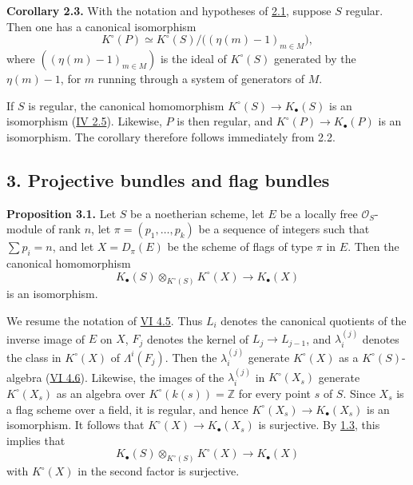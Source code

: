 \textbf{Corollary 2.3.} With the notation and hypotheses of \hyperlink{sga6.e09.para.2-1}{2.1}, suppose $S$ regular. Then one has a canonical isomorphism
\[
 K^\circ(P)\simeq K^\circ(S)/\bigl((\eta(m)-1)_{m\in M}\bigr),
\]
where $((\eta(m)-1)_{m\in M})$ is the ideal of $K^\circ(S)$ generated by the $\eta(m)-1$, for $m$ running through a system of generators of $M$.

If $S$ is regular, the canonical homomorphism $K^\circ(S)\to K_\bullet(S)$ is an isomorphism (\hyperlink{sga6.e04.para.2-5}{IV 2.5}). Likewise, $P$ is then regular, and $K^\circ(P)\to K_\bullet(P)$ is an isomorphism. The corollary therefore follows immediately from 2.2.

\subsection*{3. Projective bundles and flag bundles}

\textbf{Proposition 3.1.} Let $S$ be a noetherian scheme, let $E$ be a locally free $\mathcal O_S$-module of rank $n$, let $\pi=(p_1,\ldots,p_k)$ be a sequence of integers such that $\sum p_i=n$, and let $X=D_\pi(E)$ be the scheme of flags of type $\pi$ in $E$. Then the canonical homomorphism
\[
 K_\bullet(S)\otimes_{K^\circ(S)}K^\circ(X)\longrightarrow K_\bullet(X)
\]
is an isomorphism.

We resume the notation of \hyperlink{sga6.e06.sec.4.5}{VI 4.5}. Thus $L_i$ denotes the canonical quotients of the inverse image of $E$ on $X$, $F_j$ denotes the kernel of $L_j\to L_{j-1}$, and $\lambda_i^{(j)}$ denotes the class in $K^\circ(X)$ of $\Lambda^i(F_j)$. Then the $\lambda_i^{(j)}$ generate $K^\circ(X)$ as a $K^\circ(S)$-algebra (\hyperlink{sga6.e06.thm.4-6}{VI 4.6}). Likewise, the images of the $\lambda_i^{(j)}$ in $K^\circ(X_s)$ generate $K^\circ(X_s)$ as an algebra over $K^\circ(k(s))=\mathbb Z$ for every point $s$ of $S$. Since $X_s$ is a flag scheme over a field, it is regular, and hence $K^\circ(X_s)\to K_\bullet(X_s)$ is an isomorphism. It follows that $K^\circ(X)\to K_\bullet(X_s)$ is surjective. By \hyperlink{sga6.e09.cor.1-3}{1.3}, this implies that
\[
 K_\bullet(S)\otimes_{K^\circ(S)}K^\circ(X)\longrightarrow K_\bullet(X)
\]
with $K^\circ(X)$ in the second factor is surjective.

